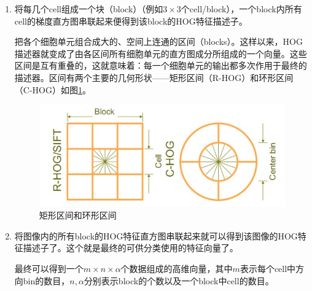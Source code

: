 \documentclass[12pt]{article}
\begin{document}
\begin{enumerate}
\item 将每几个cell组成一个块（block）（例如$3 \times 3 $个cell/block），一个block内所有cell的梯度直方图串联起来便得到该block的HOG特征描述子。
    
    把各个细胞单元组合成大的、空间上连通的区间（blocks）。这样以来，HOG描述器就变成了由各区间所有细胞单元的直方图成分所组成的一个向量。这些区间是互有重叠的，这就意味着：每一个细胞单元的输出都多次作用于最终的描述器。区间有两个主要的几何形状——矩形区间（R-HOG）和环形区间（C-HOG）如图\ref{fig:shape}。
        \begin{figure}
            \centering
            \includegraphics[width=0.5\linewidth]{shape}
            \caption{矩形区间和环形区间}
            \label{fig:shape}
        \end{figure}
        
\item 将图像内的所有block的HOG特征直方图串联起来就可以得到该图像的HOG特征描述子了。这个就是最终的可供分类使用的特征向量了。

    最终可以得到一个$m \times n \times \alpha$个数据组成的高维向量，其中$m$表示每个cell中方向bin的数目，$n,\alpha$分别表示block的个数以及一个block中cell的数目。
\end{enumerate}
\end{document}
